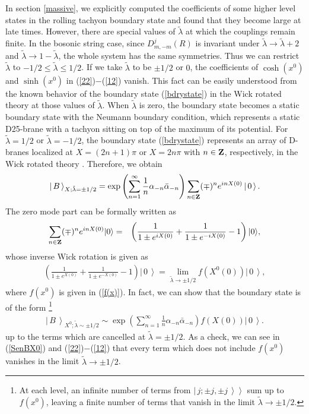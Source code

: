 \documentclass[a4paper,12pt]{article} \textheight=8.5truein
\newcommand{\ket}[1]{\left|\, #1\,\right\rangle}
\newcommand{\dket}[1]{\left.\left|\, #1\,\right\rangle\right\rangle}
\newcommand{\ra}{\rightarrow}
\newcommand{\tlambda}{\tilde{\lambda}}
\begin{document}
In section \ref{massive}, we explicitly computed the coefficients
of some higher level states in the rolling tachyon boundary state
and found that they become large at late times. However, there are
special values of $\tilde\lambda$
 at which the couplings remain finite. In the
bosonic string case, since $D^j_{m,-m}(R)$ is invariant under
$\tlambda \ra \tlambda +2$ and $\tlambda \ra 1-\tlambda$, the
whole system has the same symmetries.  Thus we can restrict
$\tlambda$ to $-1/2\le \tlambda \le 1/2$. If we take
$\tilde\lambda$ to be $\pm 1/2$ or $0$, the coefficients of
$\cosh(x^0)$ and $\sinh(x^0)$ in (\ref{22})$-$(\ref{12}) vanish.
This fact can be easily understood from the known behavior of the
boundary state (\ref{bdrystate}) in the Wick rotated theory at
those values of $\tlambda$. When $\tilde\lambda$ is zero, the
boundary state becomes a static boundary state with the Neumann
boundary condition, which represents a static D25-brane with a
tachyon sitting on top of the maximum of its potential. For
$\tilde{\lambda}=1/2$
 or $\tilde{\lambda}=-1/2$,
the boundary state (\ref{bdrystate}) represents an array of
D-branes localized at $X=(2n+1)\pi$ or $X=2n\pi$ with
$n\in{\bf Z}$, respectively, in the Wick rotated theory
\cite{Callan:1994ub,Recknagel,Sen:1999}. Therefore, we obtain
\begin{eqnarray}\label{lambdapm1/2}
\ket{B}_{X;\tlambda=\pm 1/2}=\exp\left(
\sum_{n=1}^\infty\frac{1}{n}\alpha_{-n}\bar\alpha_{-n}
\right)\sum_{n\in{\bf Z}}(\mp)^n e^{in X(0)}\ket{0}.
\end{eqnarray}
The zero mode part can be formally written as
\begin{eqnarray}\label{formalsum}
\sum_{n \in {\bf Z}}(\mp)^n e^{in X(0)}|0\rangle
&=&\left(
\frac{1}{1\pm e^{iX(0)}}
+\frac{1}{1\pm e^{-iX(0)}}-1
\right)|0\rangle,
\end{eqnarray}
whose inverse Wick rotation is given as
\begin{eqnarray}
\left(
\frac{1}{1\pm e^{X(0)}}
+\frac{1}{1\pm e^{-X(0)}}-1
\right)\ket{0}
=
\lim_{\tilde\lambda\ra\pm1/2} f(X^0(0))\ket{0},
\end{eqnarray}
where $f(x^0)$ is given in (\ref{f(x)}). In fact, we can show that
 the boundary state is of the form
 \footnote{ At each level, an infinite number of terms from
$\dket{j;\pm j,\pm j}$ sum up to $f(x^0)$, leaving a finite number
of terms that vanish in the limit $\tlambda \ra \pm 1/2$. }
\begin{eqnarray}
\ket{B}_{X^0;\tlambda\sim\pm 1/2}\sim\exp\left(
\sum_{n=1}^\infty\frac{1}{n}\alpha_{-n}\bar\alpha_{-n}
\right) f(X(0))\ket{0}.
\end{eqnarray}
up to the terms which are cancelled at $\tilde\lambda=\pm 1/2$. As
a check, we can see in (\ref{SenBX0}) and (\ref{22})$-$(\ref{12})
that every term which does not include $f(x^0)$ vanishes in the
limit $\tilde\lambda\ra\pm 1/2$.
\end{document}
